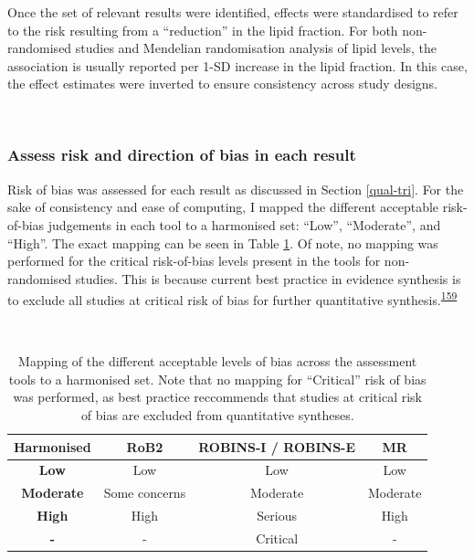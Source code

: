 \documentclass[a4paper, twoside]{templates/ociamthesis}
\begin{document}
Once the set of relevant results were identified, effects were standardised to refer to the risk resulting from a ``reduction'' in the lipid fraction. For both non-randomised studies and Mendelian randomisation analysis of lipid levels, the association is usually reported per 1-SD increase in the lipid fraction. In this case, the effect estimates were inverted to ensure consistency across study designs.

~

\hypertarget{assess-risk-and-direction-of-bias-in-each-result}{%
\subsubsection{Assess risk and direction of bias in each result}\label{assess-risk-and-direction-of-bias-in-each-result}}

Risk of bias was assessed for each result as discussed in Section \ref{qual-tri}. For the sake of consistency and ease of computing, I mapped the different acceptable risk-of-bias judgements in each tool to a harmonised set: ``Low'', ``Moderate'', and ``High''. The exact mapping can be seen in Table \ref{tab:robLevelsMapping-table}. Of note, no mapping was performed for the critical risk-of-bias levels present in the tools for non-randomised studies. This is because current best practice in evidence synthesis is to exclude all studies at critical risk of bias for further quantitative synthesis.\textsuperscript{\protect\hyperlink{ref-sterne2016}{159}}

~\\




\begin{table}[H]

\caption[Mapping of risk-of-bias judgements across assessment tools]{\label{tab:robLevelsMapping-table}Mapping of the different acceptable levels of bias across the assessment tools to a harmonised set. Note that no mapping for ``Critical'' risk of bias was performed, as best practice reccommends that studies at critical risk of bias are excluded from quantitative syntheses.}
\centering
\begin{tabular}[t]{>{}cccc}
\toprule
\textbf{Harmonised} & \textbf{RoB2} & \textbf{ROBINS-I / ROBINS-E} & \textbf{MR}\\
\midrule
\textbf{Low} & Low & Low & Low\\
\midrule
\textbf{Moderate} & Some concerns & Moderate & Moderate\\
\midrule
\textbf{High} & High & Serious & High\\
\midrule
\textbf{-} & - & Critical & -\\
\bottomrule
\end{tabular}
\end{table}
\end{document}
